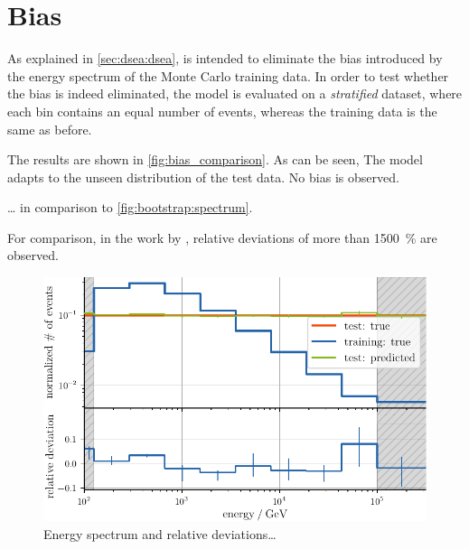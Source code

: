 \clearpage %
\section{Bias}
As explained in \autoref{sec:dsea:dsea},
\dsea{} is intended to eliminate the bias introduced by the energy spectrum of the Monte Carlo training data.
%
In order to test
whether the bias is indeed eliminated,
the model is evaluated on a \emph{stratified} dataset,
    where each bin contains an equal number of events,
whereas the training data is the same as before.

The results are shown in \autoref{fig:bias_comparison}.
As can be seen,
The model adapts to the unseen distribution of the test data.
No bias is observed.

… in comparison to \autoref{fig:bootstrap:spectrum}.

For comparison,
in the work by \citeauthor{dsea_samuel} \cite{dsea_samuel},
relative deviations of more than \SI{1500}{\percent} are observed.


\begin{figure}
  \centering
  \includegraphics[scale=1]{content/plots/bias:spectrum_full.pdf}
  \caption{
    Energy spectrum and relative deviations…
  }
  \label{fig:bias_comparison}
\end{figure}
